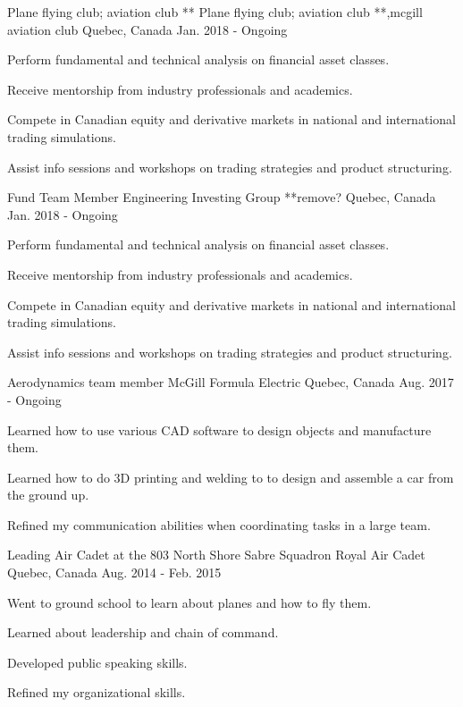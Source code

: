 

\begin{cventries}
\cventry
    {Plane flying club; aviation club **}
    {Plane flying club; aviation club **,mcgill aviation club}
    {Quebec, Canada}
    {Jan. 2018 - Ongoing}
    {
      \begin{cvitems}
        \item {Perform fundamental and technical analysis on financial asset classes.}
        \item {Receive mentorship from industry professionals and academics.}
        \item {Compete in Canadian equity and derivative markets in national and international trading simulations.}
        \item {Assist info sessions and workshops on trading strategies and product structuring.}
      \end{cvitems}
    }
\cventry
    {Fund Team Member}
    {Engineering Investing Group **remove?}
    {Quebec, Canada}
    {Jan. 2018 - Ongoing}
    {
      \begin{cvitems}
        \item {Perform fundamental and technical analysis on financial asset classes.}
        \item {Receive mentorship from industry professionals and academics.}
        \item {Compete in Canadian equity and derivative markets in national and international trading simulations.}
        \item {Assist info sessions and workshops on trading strategies and product structuring.}
      \end{cvitems}
    }
\cventry
    {Aerodynamics team member}
    {McGill Formula Electric}
    {Quebec, Canada}
    {Aug. 2017 - Ongoing}
    {
      \begin{cvitems}
        \item {Learned how to use various CAD software to design objects and manufacture them.}
        \item {Learned how to do 3D printing and welding to to design and assemble a car from the ground up.}
        \item {Refined my communication abilities when coordinating tasks in a large team.}
      \end{cvitems}
    }
  \cventry
    {Leading Air Cadet at the 803 North Shore Sabre Squadron}
    {Royal Air Cadet}
    {Quebec, Canada}
    {Aug. 2014 - Feb. 2015}
    {
      \begin{cvitems}
        \item {Went to ground school to learn about planes and how to fly them.}
        \item {Learned about leadership and chain of command.}
        \item {Developed public speaking skills.}
        \item {Refined my organizational skills.}
      \end{cvitems}
    }
\end{cventries}
